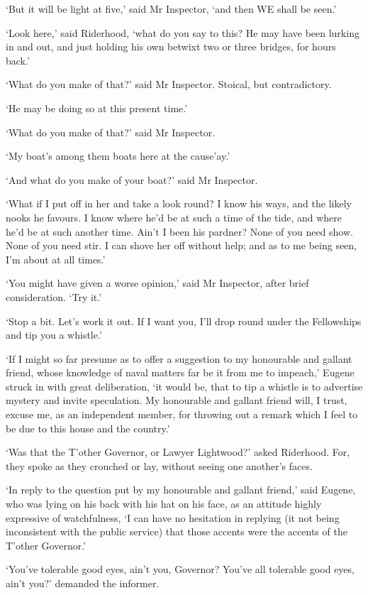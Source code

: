 ‘But it will be light at five,’ said Mr Inspector, ‘and then WE shall be
seen.’

‘Look here,’ said Riderhood, ‘what do you say to this? He may have
been lurking in and out, and just holding his own betwixt two or three
bridges, for hours back.’

‘What do you make of that?’ said Mr Inspector. Stoical, but
contradictory.

‘He may be doing so at this present time.’

‘What do you make of that?’ said Mr Inspector.

‘My boat’s among them boats here at the cause’ay.’

‘And what do you make of your boat?’ said Mr Inspector.

‘What if I put off in her and take a look round? I know his ways, and
the likely nooks he favours. I know where he’d be at such a time of the
tide, and where he’d be at such another time. Ain’t I been his pardner?
None of you need show. None of you need stir. I can shove her off
without help; and as to me being seen, I’m about at all times.’

‘You might have given a worse opinion,’ said Mr Inspector, after brief
consideration. ‘Try it.’

‘Stop a bit. Let’s work it out. If I want you, I’ll drop round under the
Fellowships and tip you a whistle.’

‘If I might so far presume as to offer a suggestion to my honourable and
gallant friend, whose knowledge of naval matters far be it from me to
impeach,’ Eugene struck in with great deliberation, ‘it would be, that
to tip a whistle is to advertise mystery and invite speculation.
My honourable and gallant friend will, I trust, excuse me, as an
independent member, for throwing out a remark which I feel to be due to
this house and the country.’

‘Was that the T’other Governor, or Lawyer Lightwood?’ asked Riderhood.
For, they spoke as they crouched or lay, without seeing one another’s
faces.

‘In reply to the question put by my honourable and gallant friend,’
said Eugene, who was lying on his back with his hat on his face, as an
attitude highly expressive of watchfulness, ‘I can have no hesitation in
replying (it not being inconsistent with the public service) that those
accents were the accents of the T’other Governor.’

‘You’ve tolerable good eyes, ain’t you, Governor? You’ve all tolerable
good eyes, ain’t you?’ demanded the informer.


